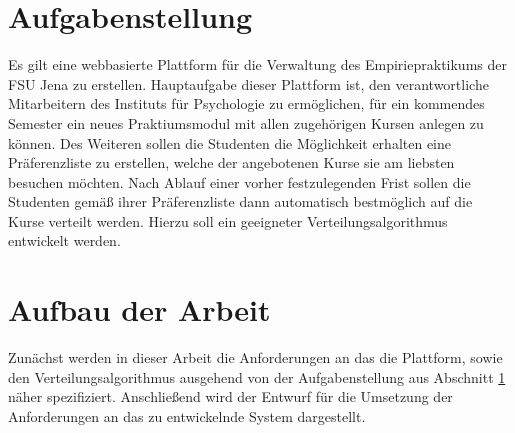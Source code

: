     \section{Aufgabenstellung}
    \label{sec:task}
        Es gilt eine webbasierte Plattform für die Verwaltung des Empiriepraktikums der FSU Jena zu erstellen.
        Hauptaufgabe dieser Plattform ist, den verantwortliche Mitarbeitern des Instituts für Psychologie zu ermöglichen, für ein kommendes Semester ein neues Praktiumsmodul mit allen zugehörigen Kursen anlegen zu können.
        Des Weiteren sollen die Studenten die Möglichkeit erhalten eine Präferenzliste zu erstellen, welche der angebotenen Kurse sie am liebsten besuchen möchten.
        Nach Ablauf einer vorher festzulegenden Frist sollen die Studenten gemäß ihrer Präferenzliste dann automatisch bestmöglich auf die Kurse verteilt werden.
        Hierzu soll ein geeigneter Verteilungsalgorithmus entwickelt werden.


    \section{Aufbau der Arbeit}
    \label{sec:structure}
        Zunächst werden in dieser Arbeit die Anforderungen an das die Plattform, sowie den Verteilungsalgorithmus ausgehend von der Aufgabenstellung aus Abschnitt \ref{sec:task} näher spezifiziert.
        Anschließend wird der Entwurf für die Umsetzung der Anforderungen an das zu entwickelnde System dargestellt.